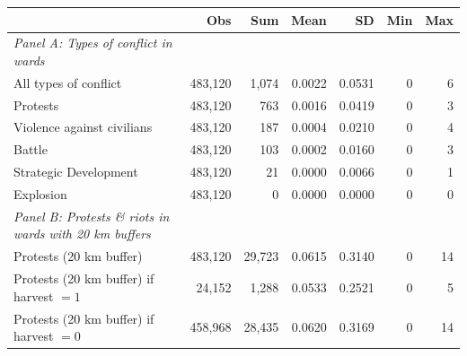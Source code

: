 \begin{tabular}{l*{6}{r}}
\toprule
 & Obs & Sum & Mean & SD & Min & Max \\
\midrule
\emph{Panel A: Types of conflict in wards}&            &            &            &            &            &            \\
All types of conflict&     483,120&       1,074&      0.0022&      0.0531&           0&           6\\
Protests    &     483,120&         763&      0.0016&      0.0419&           0&           3\\
Violence against civilians&     483,120&         187&      0.0004&      0.0210&           0&           4\\
Battle      &     483,120&         103&      0.0002&      0.0160&           0&           3\\
Strategic Development&     483,120&          21&      0.0000&      0.0066&           0&           1\\
Explosion   &     483,120&           0&      0.0000&      0.0000&           0&           0\\
\emph{Panel B: Protests \& riots in wards with 20 km buffers}&            &            &            &            &            &            \\
Protests (20 km buffer)&     483,120&      29,723&      0.0615&      0.3140&           0&          14\\
Protests (20 km buffer) if harvest $=1$&      24,152&       1,288&      0.0533&      0.2521&           0&           5\\
Protests (20 km buffer) if harvest $=0$&     458,968&      28,435&      0.0620&      0.3169&           0&          14\\
\bottomrule
\end{tabular}
